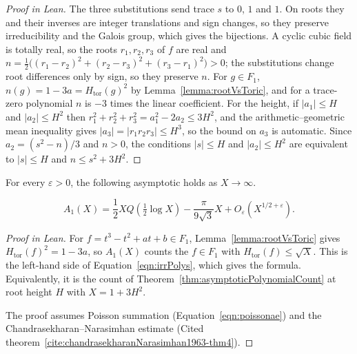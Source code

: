 \begin{proof}[Proof in Lean]

\leanok

The three substitutions send trace $s$ to $0$, $1$ and $1$. On roots they and their inverses are integer translations and sign changes, so they preserve irreducibility and the Galois group, which gives the bijections. A cyclic cubic field is totally real, so the roots $r_1,r_2,r_3$ of $f$ are real and $n=\frac12\bigl((r_1-r_2)^2+(r_2-r_3)^2+(r_3-r_1)^2\bigr)>0$; the substitutions change root differences only by sign, so they preserve $n$. For $g\in F_1$, $n(g)=1-3a=H_{\mathrm{tor}}(g)^2$ by Lemma~\ref{lemma:rootVsToric}, and for a trace-zero polynomial $n$ is $-3$ times the linear coefficient. For the height, if $|a_1|\leq H$ and $|a_2|\leq H^2$ then $r_1^2+r_2^2+r_3^2=a_1^2-2a_2\leq3H^2$, and the arithmetic--geometric mean inequality gives $|a_3|=|r_1r_2r_3|\leq H^3$, so the bound on $a_3$ is automatic. Since $a_2=(s^2-n)/3$ and $n>0$, the conditions $|s|\leq H$ and $|a_2|\leq H^2$ are equivalent to $|s|\leq H$ and $n\leq s^2+3H^2$.

\end{proof}

\begin{equationnode}

\label{eqn:A1asymptotic}


\leanok

For every $\varepsilon>0$, the following asymptotic holds as $X\to\infty$.

\begin{equation*} A_1(X) =\frac12XQ\left(\tfrac12\log X\right) -\frac{\pi}{9\sqrt3}X +O_\varepsilon(X^{1/2+\varepsilon}). \end{equation*}

\end{equationnode}

\begin{proof}[Proof in Lean]

\leanok


For $f=t^3-t^2+at+b\in F_1$, Lemma~\ref{lemma:rootVsToric} gives $H_{\mathrm{tor}}(f)^2=1-3a$, so $A_1(X)$ counts the $f\in F_1$ with $H_{\mathrm{tor}}(f)\leq\sqrt X$. This is the left-hand side of Equation~\ref{eqn:irrPolys}, which gives the formula. Equivalently, it is the count of Theorem~\ref{thm:asymptoticPolynomialCount} at root height $H$ with $X=1+3H^2$.

The proof assumes Poisson summation (Equation~\ref{eqn:poissonae}) and the Chandrasekharan--Narasimhan estimate (Cited theorem~\ref{cite:chandrasekharanNarasimhan1963-thm4}).

\end{proof}

